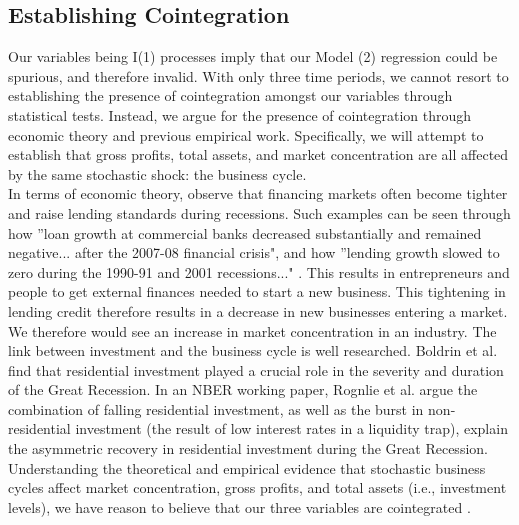 \subsection{Establishing Cointegration}

Our variables being I(1) processes imply that our Model (2) regression could be spurious, and therefore invalid. With only three time periods, we cannot resort to establishing the presence of cointegration amongst our variables through statistical tests. Instead, we argue for the presence of cointegration through economic theory and previous empirical work. Specifically, we will attempt to establish that gross profits, total assets, and market concentration are all affected by the same stochastic shock: the business cycle. \\

In terms of economic theory, observe that financing markets often become tighter and raise lending standards during recessions. Such examples can be seen through how ''loan growth at commercial banks decreased substantially and remained negative... after the 2007-08 financial crisis", and how ''lending growth slowed to zero during the 1990-91  and 2001 recessions..." \cite[Dvorkin and Shell, 2016]{Dvorkin2016}. This results in entrepreneurs and people to get external finances needed to start a new business. This tightening in lending credit therefore results in a decrease in new businesses entering a market. We therefore would see an increase in market concentration in an industry. The link between investment and the business cycle is well researched. Boldrin et al. find that residential investment played a crucial role in the severity and duration of the Great Recession. In an NBER working paper, Rognlie et al. argue the combination of falling residential investment, as well as the burst in non-residential investment (the result of low interest rates in a liquidity trap), explain the asymmetric recovery in residential investment during the Great Recession. Understanding the theoretical and empirical evidence that stochastic business cycles affect market concentration, gross profits, and total assets (i.e., investment levels), we have reason to believe that our three variables are cointegrated \cite[Vassolo et al., 2015]{Vassolo01012015}\cite[Gallet and Euzent, 2011]{Gallet2011}\cite[Machin and Van Reenen, 1993]{Machin1993} \cite[Rognlie et al., 2014]{Rognlie2014} \cite[Boldrin et al., 2013]{Boldrin2013}. \\

